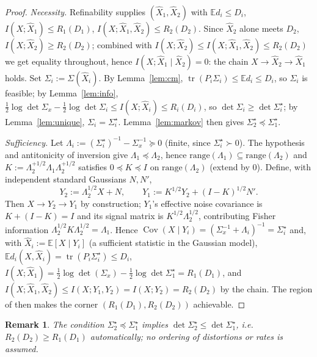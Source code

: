 \documentclass[11pt]{article}
\newtheorem{remark}{Remark}\newtheorem{example}{Example}
\newcommand{\E}{\mathbb{E}}\newcommand{\tr}{\operatorname{tr}}
\newcommand{\Cov}{\operatorname{Cov}}
\begin{document}
\begin{proof}
\emph{Necessity.} Refinability supplies $(\hat X_1,\hat X_2)$ with
$\E d_i\le D_i$, $I(X;\hat X_1)\le R_1(D_1)$,
$I(X;\hat X_1,\hat X_2)\le R_2(D_2)$. Since $\hat X_2$ alone meets $D_2$,
$I(X;\hat X_2)\ge R_2(D_2)$; combined with
$I(X;\hat X_2)\le I(X;\hat X_1,\hat X_2)\le R_2(D_2)$ we get equality
throughout, hence $I(X;\hat X_1\mid\hat X_2)=0$: the chain
$X\to\hat X_2\to\hat X_1$ holds. Set $\Sigma_i:=\Sigma(\hat X_i)$. By
Lemma~\ref{lem:cm}, $\tr(P_i\Sigma_i)\le\E d_i\le D_i$, so $\Sigma_i$ is
feasible; by Lemma~\ref{lem:info},
$\tfrac12\log\det\Sigma_x-\tfrac12\log\det\Sigma_i\le I(X;\hat X_i)\le
R_i(D_i)$, so $\det\Sigma_i\ge\det\Sigma_i^\star$; by
Lemma~\ref{lem:unique}, $\Sigma_i=\Sigma_i^\star$. Lemma~\ref{lem:markov}
then gives $\Sigma_2^\star\preceq\Sigma_1^\star$.

\emph{Sufficiency.} Let $\Lambda_i:=(\Sigma_i^\star)^{-1}-\Sigma_x^{-1}
\succeq0$ (finite, since $\Sigma_i^\star\succ0$). The hypothesis and
antitonicity of inversion give $\Lambda_1\preceq\Lambda_2$, hence
$\mathrm{range}(\Lambda_1)\subseteq\mathrm{range}(\Lambda_2)$ and
$K:=\Lambda_2^{+1/2}\Lambda_1\Lambda_2^{+1/2}$ satisfies $0\preceq K\preceq
I$ on $\mathrm{range}(\Lambda_2)$ (extend by $0$). Define, with independent
standard Gaussians $N,N'$,
\[
Y_2:=\Lambda_2^{1/2}X+N,\qquad
Y_1:=K^{1/2}Y_2+(I-K)^{1/2}N' .
\]
Then $X\to Y_2\to Y_1$ by construction; $Y_1$'s effective noise covariance is
$K+(I-K)=I$ and its signal matrix is $K^{1/2}\Lambda_2^{1/2}$, contributing
Fisher information
$\Lambda_2^{1/2}K\Lambda_2^{1/2}=\Lambda_1$. Hence
$\Cov(X\mid Y_i)=(\Sigma_x^{-1}+\Lambda_i)^{-1}=\Sigma_i^\star$ and, with
$\hat X_i:=\E[X\mid Y_i]$ (a sufficient statistic in the Gaussian model),
$\E d_i(X,\hat X_i)=\tr(P_i\Sigma_i^\star)\le D_i$,
$I(X;\hat X_1)=\tfrac12\log\det(\Sigma_x)-\tfrac12\log\det\Sigma_1^\star
=R_1(D_1)$, and
$I(X;\hat X_1,\hat X_2)\le I(X;Y_1,Y_2)=I(X;Y_2)=R_2(D_2)$ by the chain.
The region of \cite{rimoldi,effros,kostinatuncel} then makes the corner
$(R_1(D_1),R_2(D_2))$ achievable.
\end{proof}

\begin{remark}
The condition $\Sigma_2^\star\preceq\Sigma_1^\star$ implies
$\det\Sigma_2^\star\le\det\Sigma_1^\star$, i.e.\ $R_2(D_2)\ge R_1(D_1)$
automatically; no ordering of distortions or rates is assumed.
\end{remark}
\end{document}

